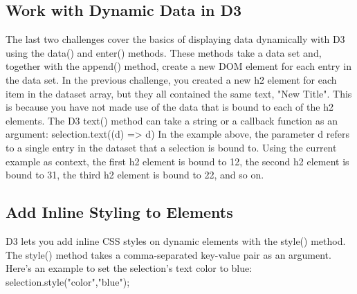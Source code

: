 \documentclass{article}%
\begin{document}
%
\subsection{Work with Dynamic Data in D3}%
\label{subsec:WorkwithDynamicDatainD3}%
The last two challenges cover the basics of displaying data dynamically with D3 using the data() and enter() methods. These methods take a data set and, together with the append() method, create a new DOM element for each entry in the data set.\newline%
In the previous challenge, you created a new h2 element for each item in the dataset array, but they all contained the same text, "New Title". This is because you have not made use of the data that is bound to each of the h2 elements.\newline%
The D3 text() method can take a string or a callback function as an argument:\newline%
selection.text((d) => d)\newline%
In the example above, the parameter d refers to a single entry in the dataset that a selection is bound to.\newline%
Using the current example as context, the first h2 element is bound to 12, the second h2 element is bound to 31, the third h2 element is bound to 22, and so on.\newline%

%
\subsection{Add Inline Styling to Elements}%
\label{subsec:AddInlineStylingtoElements}%
D3 lets you add inline CSS styles on dynamic elements with the style() method.\newline%
The style() method takes a comma{-}separated key{-}value pair as an argument. Here's an example to set the selection's text color to blue:\newline%
selection.style("color","blue");\newline%

%
\end{document}
